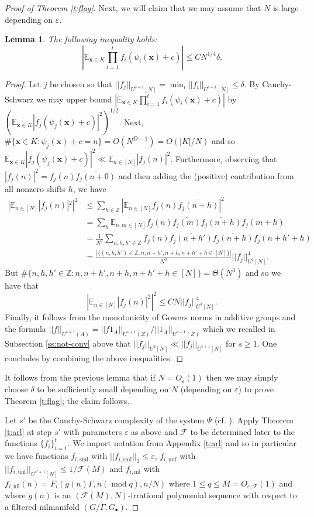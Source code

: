 \documentclass[10pt]{article}
\def\cF{\mathcal{F}}
\def\eps{\varepsilon}
\def\Z{\mathbb{Z}}
\def\E{\mathbb{E}}
\def\nil{\mathrm{nil}}
\def\unf{\mathrm{unf}}
\def\sml{\mathrm{sml}}
\DeclareMathOperator\mo{mod}
\newcommand{\vect}[1]{\boldsymbol{#1}}
\newtheorem{lemma}[firstthm]{Lemma}
\begin{document}
\begin{proof}[Proof of Theorem \ref{t:flag}]
Next, we will claim that we may assume that $N$ is large depending on $\eps$. 
\begin{lemma}\label{l:smallN}
The following inequality holds:
 \[ \left|\E_{\vect x \in K} \prod_{i=1}^t f_i(\psi_i(\vect x)+c)\right| \leq CN^{1/4}\delta.\]
\end{lemma}
\begin{proof}
Let $j$ be chosen so that $||f_j||_{U^{s+1}[N]} = \min_i ||f_i||_{U^{s+1}[N]} \leq \delta$. By Cauchy-Schwarz we may upper bound $|\E_{\vect x \in K} \prod_{i=1}^t f_i(\psi_i(\vect x)+c)|$ by $(\E_{\vect x \in K}|f_j(\psi_j(\vect x)+c)|^2)^{1/2}$. Next, $\#\{\vect x \in K : \psi_j(\vect x) + c = n\} = O(N^{D-1}) = O(|K|/N)$ and so $\E_{\vect x \in K}|f_j(\psi_j(\vect x)+c)|^2 \ll \E_{n \in [N]}|f_j(n)|^2$. Furthermore, observing that $|f_j(n)|^2 = f_j(n)\overline{f_j(n+0)}$ and then adding the (positive) contribution from all nonzero shifts $h$, we have
\begin{align*}
|\E_{n \in [N]}|f_j(n)|^2|^2 &\leq  \sum_{h\in \Z} |\E_{n \in [N]}f_j(n)\overline{f_j(n+h)}|^2\\
&= \sum_h \E_{n,m \in [N]}f_j(n)\overline{f_j(m)}\overline{f_j(n+h)}f_j(m+h)\\
&= \frac{1}{N^2} \sum_{n,h,h' \in \Z} f_j(n)\overline{f_j(n+h')}\overline{f_j(n+h)}f_j(n+h'+h)\\
&= \frac{\left|\{(n,h,h')\in \Z: n,n+h',n+h,n+h'+h \in [N]\}\right|}{N^2}||f_j||_{U^2[N]}^4.
\end{align*}
But $\#\{n,h,h'\in \Z: n,n+h',n+h,n+h'+h \in [N]\} = \Theta(N^3)$ and so we have that 
\[\left|\E_{n \in [N]}|f_j(n)|^2\right|^2 \leq CN||f_j||_{U^2[N]}^4. \]
Finally, it follows from the monotonicity of Gowers norms in additive groups and the formula $ ||f||_{U^{s+1}{(A)}} =  ||f1_A||_{U^{s+1}{(Z)}}/||1_A||_{U^{s+1}{(Z)}}$ which we recalled in Subsection \ref{ss:not-conv} above that $||f_j||_{U^2[N]} \ll ||f_j||_{U^{s+1}[N]}$ for $s \geq 1$. One concludes by combining the above inequalities. 
\end{proof}
It follows from the previous lemma that if $N = O_\eps(1)$ then we may simply choose $\delta$ to be sufficiently small depending on $N$ (depending on $\eps$) to prove Theorem \ref{t:flag}; the claim follows.
 


Let $s'$ be the Cauchy-Schwarz complexity of the system $\Psi$ (cf. \cite[Definition 1.3.2]{T12}). Apply Theorem \ref{t:arl} at step $s'$ with parameters $\eps$ as above and $\cF$ to be determined later to the functions  $\{  f_i\}_{i=1}^t$. We import notation from Appendix \ref{t:arl} and so in particular we have functions $ f_{i,\sml}$ with $|| f_{i,\sml}||_2 \leq \eps$, $ f_{i,\unf}$ with $|| f_{i,\unf}||_{U^{s'+1}[N]} \leq 1/\cF(M)$ and $ f_{i,\nil}$ with $ f_{i,\nil}(n) = F_i(g(n)\Gamma, n (\mo q), n/N)$ where $1 \leq q \leq M = O_{\eps, \cF}(1)$ and where $g(n)$ is an $(\cF (M),N)$-irrational polynomial sequence with respect to a filtered nilmanifold $(G/\Gamma, G_\bullet)$.



\end{proof}
\end{document}
